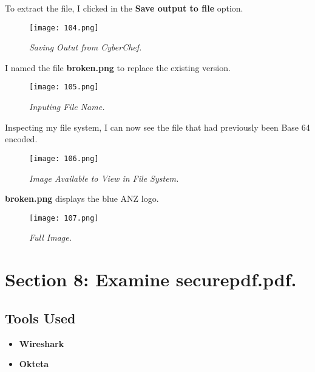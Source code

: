 To extract the file, I clicked in the \textbf{Save output to file} option. 

\begin{figure}[H]
    \setlength{\abovecaptionskip}{20pt}
    \setlength{\belowcaptionskip}{0pt}
    \centering
    \texttt{[image: 104.png]}
    \captionsetup{justification=centering}
    \caption{\textit{Saving Outut from CyberChef.}}
    \label{fig:104}
\end{figure}
\vspace{-10pt}

I named the file \textbf{broken.png} to replace the existing version. 

\begin{figure}[H]
    \setlength{\abovecaptionskip}{20pt}
    \setlength{\belowcaptionskip}{0pt}
    \centering
    \texttt{[image: 105.png]}
    \captionsetup{justification=centering}
    \caption{\textit{Inputing File Name.}}
    \label{fig:105}
\end{figure}
\vspace{-10pt}

Inspecting my file system, I can now see the file that had previously been Base 64 encoded.

\begin{figure}[H]
    \setlength{\abovecaptionskip}{20pt}
    \setlength{\belowcaptionskip}{0pt}
    \centering
    \texttt{[image: 106.png]}
    \captionsetup{justification=centering}
    \caption{\textit{Image Available to View in File System.}}
    \label{fig:106}
\end{figure}
\vspace{-10pt}

\textbf{broken.png} displays the blue ANZ logo.

\begin{figure}[H]
    \setlength{\abovecaptionskip}{20pt}
    \setlength{\belowcaptionskip}{0pt}
    \centering
    \texttt{[image: 107.png]}
    \captionsetup{justification=centering}
    \caption{\textit{Full Image.}}
    \label{fig:107}
\end{figure}
\vspace{-10pt}

\section{Section 8: Examine \textbf{securepdf.pdf}.}
\subsection{Tools Used}
\begin{itemize}
    \item \textbf{Wireshark}
    \item \textbf{Okteta}
\end{itemize}

